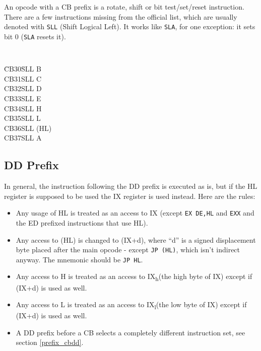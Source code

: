 \documentclass[12pt,twoside,openright,a4paper]{book}
\newcommand{\High}{\textsubscript{h}}
\newcommand{\Low}{\textsubscript{l}}
\begin{document}
An opcode with a CB prefix is a rotate, shift or bit test/set/reset instruction. There are a few instructions missing from the official list, which are usually denoted with {\tt SLL} (Shift Logical Left). It works like {\tt SLA}, for one exception: it sets bit 0 ({\tt SLA} resets it).

{\tt 
  \begin{tabbing}
    {\qquad}\=CB30\qquad\=SLL B \+\\
       CB31\>SLL C\\
       CB32\>SLL D\\
       CB33\>SLL E\\
       CB34\>SLL H\\
       CB35\>SLL L\\
       CB36\>SLL (HL)\\
       CB37\>SLL A
	\end{tabbing}
}


\subsection{DD Prefix \cite{gerton}}

In general, the instruction following the DD prefix is executed as is, but if the HL register is supposed to be used the IX register is used instead. Here are the rules:

\begin{itemize}[topsep=1pt,itemsep=1pt]
	\item Any usage of HL is treated as an access to IX (except {\tt EX DE,HL} and {\tt EXX} and the ED prefixed instructions that use HL).
	
	\item Any access to (HL) is changed to (IX+d), where ``d'' is a signed displacement byte placed after the main opcode - except {\tt JP (HL)}, which isn't indirect anyway. The mnemonic should be {\tt JP HL}.
	
	\item Any access to H is treated as an access to IX\High (the high byte of IX) except if (IX+d) is used as well.
	
	\item Any access to L is treated as an access to IX\Low (the low byte of IX) except if (IX+d) is used as well.
	
	\item A DD prefix before a CB selects a completely different instruction set, see section {\ref{prefix_cbdd}}.
\end{itemize}
\end{document}
